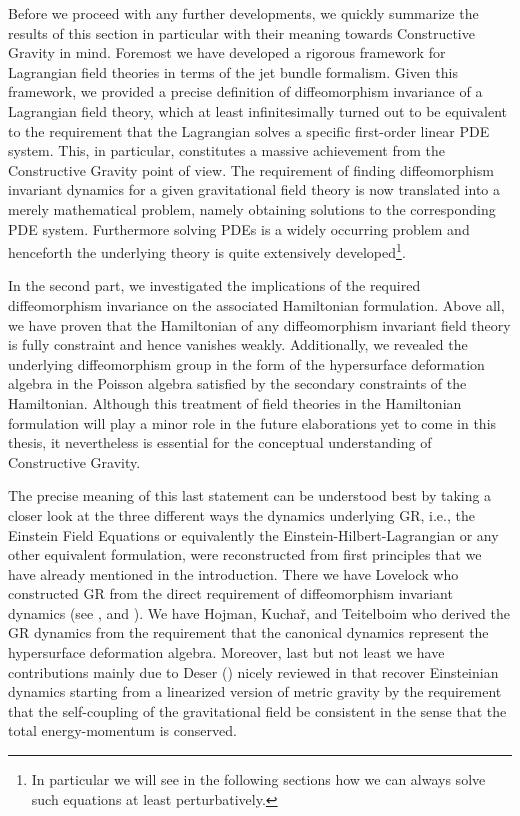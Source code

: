 Before we proceed with any further developments, we quickly summarize the results of this section in particular with their meaning towards Constructive Gravity in mind. 
Foremost we have developed a rigorous framework for Lagrangian field theories in terms of the jet bundle formalism.  Given this framework, we provided a precise definition of diffeomorphism invariance of a Lagrangian field theory, which at least infinitesimally turned out to be equivalent to the requirement that the Lagrangian solves a specific first-order linear PDE system.  This, in particular, constitutes a massive achievement from the Constructive Gravity point of view. The requirement of finding diffeomorphism invariant dynamics for a given gravitational field theory is now translated into a merely mathematical problem, namely obtaining solutions to the corresponding PDE system. Furthermore solving PDEs is a widely occurring problem and henceforth the underlying theory is quite extensively developed\footnote{In particular we will see in the following sections how we can always solve such equations at least perturbatively.}.

In the second part, we investigated the implications of the required diffeomorphism invariance on the associated Hamiltonian formulation. Above all, we have proven that the Hamiltonian of any diffeomorphism invariant field theory is fully constraint and hence vanishes weakly. Additionally, we revealed the underlying diffeomorphism group in the form of the hypersurface deformation algebra in the Poisson algebra satisfied by the secondary constraints of the Hamiltonian. Although this treatment of field theories in the Hamiltonian formulation will play a minor role in the future elaborations yet to come in this thesis, it nevertheless is essential for the conceptual understanding of Constructive Gravity. 

The precise meaning of this last statement can be understood best by taking a closer look at the three different ways the dynamics underlying GR, i.e., the Einstein Field Equations or equivalently the Einstein-Hilbert-Lagrangian or any other equivalent formulation, were reconstructed from first principles that we have already mentioned in the introduction. There we have Lovelock who constructed GR from the direct requirement of diffeomorphism invariant dynamics (see \cite{Lovelock1969}, \cite{doi:10.1063/1.1665613} and \cite{doi:10.1063/1.1666069}). 
We have Hojman, Kuchař, and Teitelboim who derived the GR dynamics from the requirement that the canonical dynamics represent the hypersurface deformation algebra. Moreover, last but not least we have contributions mainly due to Deser (\cite{1970GReGr...1....9D}) nicely reviewed in \cite{2008IJMPD..17..367P} that recover Einsteinian dynamics starting from a linearized version of metric gravity by the requirement that the self-coupling of the gravitational field be consistent in the sense that the total energy-momentum is conserved.

